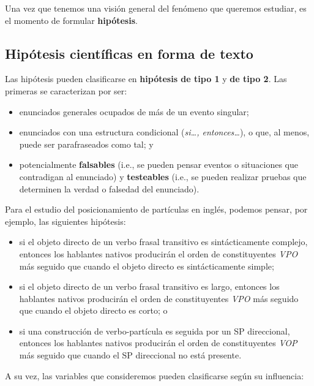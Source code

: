 \documentclass[12pt,spanish,a4paper,]{article}
\providecommand{\tightlist}{%
  \setlength{\itemsep}{0pt}\setlength{\parskip}{0pt}}
\begin{document}
Una vez que tenemos una visión general del fenómeno que queremos
estudiar, es el momento de formular \textbf{hipótesis}.

\hypertarget{hipotesis-cientificas-en-forma-de-texto}{%
\subsection{Hipótesis científicas en forma de
texto}\label{hipotesis-cientificas-en-forma-de-texto}}

Las hipótesis pueden clasificarse en \textbf{hipótesis de tipo 1} y
\textbf{de tipo 2}. Las primeras se caracterizan por ser:

\begin{itemize}
\tightlist
\item
  enunciados generales ocupados de más de un evento singular;
\item
  enunciados con una estructura condicional (\emph{si\ldots,
  entonces\ldots{}}), o que, al menos, puede ser parafraseados como tal;
  y
\item
  potencialmente \textbf{falsables} (i.e., se pueden pensar eventos o
  situaciones que contradigan al enunciado) y \textbf{testeables} (i.e.,
  se pueden realizar pruebas que determinen la verdad o falsedad del
  enunciado).
\end{itemize}

Para el estudio del posicionamiento de partículas en inglés, podemos
pensar, por ejemplo, las siguientes hipótesis:

\begin{itemize}
\tightlist
\item
  \protect\hypertarget{h1}{}{si} el objeto directo de un verbo frasal
  transitivo es sintácticamente complejo, entonces los hablantes nativos
  producirán el orden de constituyentes \emph{VPO} más seguido que
  cuando el objeto directo es sintácticamente simple;
\item
  si el objeto directo de un verbo frasal transitivo es largo, entonces
  los hablantes nativos producirán el orden de constituyentes \emph{VPO}
  más seguido que cuando el objeto directo es corto; o
\item
  si una construcción de verbo-partícula es seguida por un SP
  direccional, entonces los hablantes nativos producirán el orden de
  constituyentes \emph{VOP} más seguido que cuando el SP direccional no
  está presente.
\end{itemize}

A su vez, las variables que consideremos pueden clasificarse según su
influencia:
\end{document}
